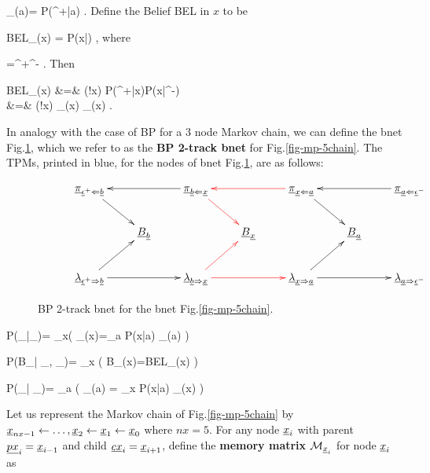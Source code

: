 \beq 
\lam_{\rvx\rdart \rva}(a)=
P(\eps^+|a)
\;.
\eeq
Define the Belief BEL in $x$ to be

\beq
BEL_\rvx(x)
=
P(x|\eps)
\;,
\eeq
where

\beq
\rveps=\rveps^+\cup\rveps^-
\;.
\eeq
Then


\beqa
BEL_\rvx(x)
&=&
\caln(!x)
P(\eps^+|x)P(x|\eps^-)
\\
&=&
\caln(!x)
\lam_{\rvb\rdart \rvx}(x)
\pi_{\rvb\ldart \rvx}(x)
\;.
\eeqa

In analogy
with the case of BP for a 3 node Markov
chain, we can define the bnet
Fig.\ref{fig-BEL-4pi},
which we refer to as the
{\bf BP
2-track bnet} for Fig.\ref{fig-mp-5chain}.
The TPMs, printed in blue,
 for the 
nodes of bnet Fig.\ref{fig-BEL-4pi}, are
as follows:





\begin{figure}[h!]
$$\xymatrix{
&\ul{\pi}_{\rveps^+\ldart\rvb}\ar[dr]
&&\ul{\pi}_{\rvb\ldart\rvx}\ar[ll]\ar@[red][dr]
&&\ul{\pi}_{\rvx\ldart\rva}\ar@[red][ll]\ar[dr]
&&\ul{\pi}_{\rva\ldart\rveps^-}\ar[ll]
\\
&&\rvB_\rvb
&&\rvB_\rvx
&&\rvB_\rva
\\
&\ul{\lam}_{\rveps^+\rdart\rvb}\ar[rr]\ar[ur]
&&\ul{\lam}_{\rvb\rdart\rvx}\ar@[red][rr]\ar@[red][ur]
&&\ul{\lam}_{\rvx\rdart\rva}\ar[rr]\ar[ur]
&&\ul{\lam}_{\rva\rdart\rveps^-}
}$$
\caption{BP 2-track bnet for the bnet
Fig.\ref{fig-mp-5chain}.}
\label{fig-BEL-4pi}
\end{figure}


\beq\color{blue}
P(\pi_{\rvb\ldart\rvx}|\pi_{\rvx\ldart\rva})=
\prod_{x}\indi\left(
\pi_{\rvb\ldart\rvx}(x)=\sum_a P(x|a)
\pi_{\rvx\ldart\rva}(a)
\right)
\label{eq-pr-pi-bar-pi}
\eeq

\beq\color{blue}
P(B_\rvx|
\pi_{\rvb\ldart \rvx},
\lam_{\rvb\rdart \rvx})=
\prod_x
\indi\left(
B_\rvx(x)=BEL_\rvx(x)
\right)
\eeq

\beq\color{blue}
P(\lam_{\rvx\rdart \rva}|
\lam_{\rvb\rdart \rvx})=
\prod_{a}
\indi\left(
\lam_{\rvx\rdart \rva}(a)
=
\sum_x P(x|a)
\lam_{\rvb\rdart \rvx}(x)
\right)
\label{eq-pr-lam-bar-lam}
\eeq

Let us represent the Markov
chain of Fig.\ref{fig-mp-5chain}
by
${\underline{x}}_{nx-1}
\leftarrow \ldots, {\underline{x}}_2\leftarrow {\underline{x}}_1\leftarrow {\underline{x}}_0$
where $nx=5$.
For any node 
${\underline{x}}_i$
with
parent $\underline{px}_i={\underline{x}}_{i-1}$
and child $\underline{cx}_i={\underline{x}}_{i+1}$, 
define
the {\bf memory matrix}
${\cal M}_{{\underline{x}}_i}$
for node ${\underline{x}}_i$
as

